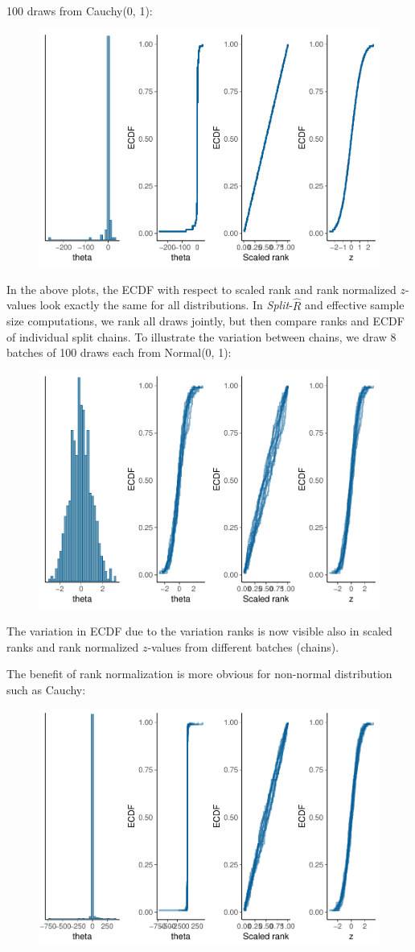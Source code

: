 \documentclass[american,]{article}
\begin{document}
100 draws from Cauchy(0, 1):

\begin{figure}[t]
  \centering
  \includegraphics[width=0.6\linewidth]{graphics/ranknorm-cauchy-1.pdf}
\end{figure}

In the above plots, the ECDF with respect to scaled rank and rank
normalized \(z\)-values look exactly the same for all distributions. In
\emph{Split}-\(\widehat{R}\) and effective sample size computations, we
rank all draws jointly, but then compare ranks and ECDF of individual
split chains. To illustrate the variation between chains, we draw 8
batches of 100 draws each from Normal(0, 1):

\begin{figure}[t]
  \centering
  \includegraphics[width=0.6\linewidth]{graphics/ranknorm-normal2-1.pdf}
\end{figure}

The variation in ECDF due to the variation ranks is now visible also in
scaled ranks and rank normalized \(z\)-values from different batches
(chains).

The benefit of rank normalization is more obvious for non-normal
distribution such as Cauchy:

\begin{figure}[t]
  \centering
  \includegraphics[width=0.6\linewidth]{graphics/ranknorm-cauchy2-1.pdf}
\end{figure}
\end{document}
